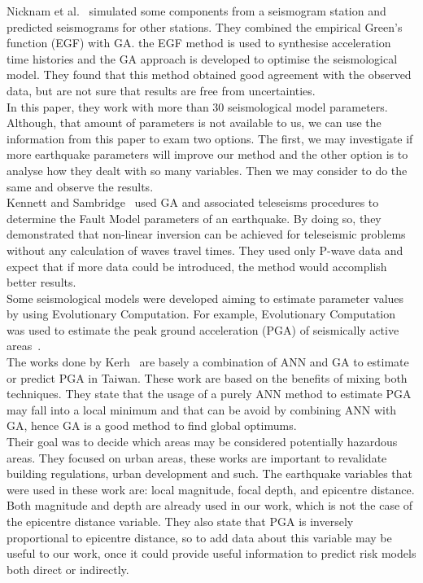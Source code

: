 Nicknam et al.~\cite{Nicknam2010} simulated some components from a seismogram station and predicted seismograms for other stations. They combined the empirical Green’s function (EGF) with GA. the EGF method is used to synthesise acceleration time histories and the GA approach is developed to optimise the seismological model. They found that this method obtained good agreement with the observed data, but are not sure that results are free from uncertainties.\\

In this paper, they work with more than 30 seismological model parameters. Although, that amount of parameters is not available to us, we can use the information from this paper to exam two options. The first, we may investigate if more earthquake parameters will improve our method and the other option is to analyse how they dealt with so many variables. Then we may consider to do the same and observe the results.\\  

Kennett and Sambridge~\cite{Kennett1992} used GA and associated teleseisms procedures to determine the Fault Model parameters of an earthquake. By doing so, they demonstrated that non-linear inversion can be achieved for teleseismic problems without any calculation of waves travel times. They used only P-wave data and expect that if more data could be introduced, the method would accomplish better results.\\

Some seismological models were developed aiming to estimate parameter values by using Evolutionary Computation. For example, Evolutionary Computation was used to estimate the peak ground acceleration (PGA) of seismically active areas~\cite{Kermani2009,Cabalar2009,Kerh2010,Kerh2015}. \\

The works done by Kerh~\cite{Kerh2010, Kerh2015} are basely a combination of ANN and GA to estimate or predict PGA in Taiwan. These work are based on the benefits of mixing both techniques. They state that the usage of a purely ANN method to estimate PGA may fall into a local minimum and that can be avoid by combining ANN with GA, hence GA is a good method to find global optimums.\\

Their goal was to decide which areas may be considered potentially hazardous areas. They focused on urban areas, these works are important to revalidate building regulations, urban development and such. The earthquake variables that were used in these work are: local magnitude, focal depth, and epicentre distance. Both magnitude and depth are already used in our work, which is not the case of the epicentre distance variable. They also state that PGA is inversely proportional to epicentre distance, so to add data about this variable may be useful to our work, once it could provide useful information to predict risk models both direct or indirectly.\\
 
